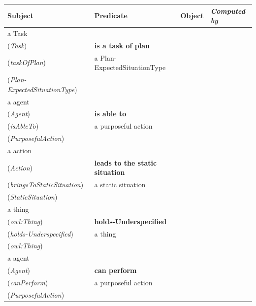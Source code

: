 \documentclass{svmult}
\begin{document}
\begin{table}[h]
	\centering
	\begin{tabular}{p{3cm}p{6cm}p{3cm}l}
		\textbf{Subject} & \textbf{Predicate} & \textbf{Object} & \emph{Computed by} \\
		\hline


 a Task
\\ (\emph{Task})  & 

\textbf{is a task of plan}
\\ (\emph{taskOfPlan})  & 

 a Plan-ExpectedSituationType
\\ (\emph{Plan-ExpectedSituationType})  & 

 \\ 


 a agent
\\ (\emph{Agent})  & 

\textbf{is able to}
\\ (\emph{isAbleTo})  & 

 a purposeful action
\\ (\emph{PurposefulAction})  & 

 \\ 


 a action
\\ (\emph{Action})  & 

\textbf{leads to the static situation}
\\ (\emph{bringsToStaticSituation})  & 

 a static situation
\\ (\emph{StaticSituation})  & 

 \\ 


 a thing
\\ (\emph{owl:Thing})  & 

\textbf{holds-Underspecified}
\\ (\emph{holds-Underspecified})  & 

 a thing
\\ (\emph{owl:Thing})  & 

 \\ 


 a agent
\\ (\emph{Agent})  & 

\textbf{can perform}
\\ (\emph{canPerform})  & 

 a purposeful action
\\ (\emph{PurposefulAction})  & 


\end{tabular}
\end{table}
\end{document}
